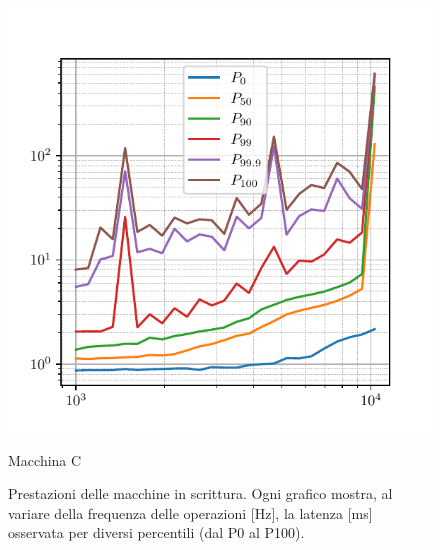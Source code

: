 \begin{figure}[htbp]
    \vspace{0.5cm}
    \begin{minipage}[t]{0.48\textwidth}
        \centering
        \includegraphics[width=\textwidth]{03-risultati/bench-set-h}
        \caption*{Macchina C}
    \end{minipage}

    \caption{Prestazioni delle macchine in scrittura. Ogni grafico mostra, al variare della frequenza delle operazioni [Hz], la latenza [ms] osservata per diversi percentili (dal P0 al P100).}
    \label{fig:bench-set}
\end{figure}


